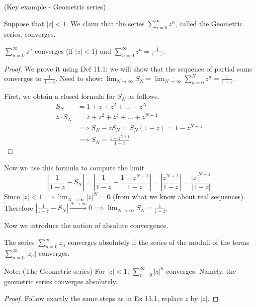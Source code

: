 \begin{example} \label{example:13.1} (Key example - Geometric series)

Suppose that $|z| < 1$. We claim that the series $\sum_{n=0}^{\infty} z^n$, called the Geometric series, converges.
\begin{claim}\label{claim:11.5}
    $\sum_{n=0}^{\infty} z^n$ converges (if $|z| < 1$) and $\sum_{n=0}^{\infty} z^n = \frac{1}{1-z}$.
\end{claim}
\begin{proof}
    We prove it using Def 11.1: we will show that the sequence of partial sums converges to $\frac{1}{1-z}$.
    Need to show: $\lim_{N \to \infty} S_N = \lim_{N \to \infty} \sum_{n=0}^{N} z^n = \frac{1}{1-z}$.
    
    First, we obtain a closed formula for $S_N$ as follows.
    \begin{align*}
        S_N &= 1 + z + z^2 + \dots + z^N \\
        z \cdot S_N &= z + z^2 + z^3 + \dots + z^{N+1} \\
        &\implies S_N - zS_N = S_N(1-z) = 1 - z^{N+1} \\
        &\implies S_N = \frac{1 - z^{N+1}}{1-z}
    \end{align*}
\end{proof}
Now we use this formula to compute the limit
\[ \left| \frac{1}{1-z} - S_N \right| = \left| \frac{1}{1-z} - \frac{1 - z^{N+1}}{1-z} \right| = \left| \frac{z^{N+1}}{1-z} \right| = \frac{|z|^{N+1}}{|1-z|} \]
Since $|z| < 1 \implies \lim_{N \to \infty} |z|^N = 0$ (from what we know about real sequences). Therefore $\left| \frac{1}{1-z} - S_N \right| \xrightarrow{N \to \infty} 0 \implies \lim_{N \to \infty} S_N = \frac{1}{1-z}$.
\end{example}


Now we introduce the notion of absolute convergence.

\begin{definition}\label{definition:11.2} The series $\sum_{n=0}^{\infty} z_n$ converges absolutely if the series of the moduli of the terms $\sum_{n=0}^{\infty} |z_n|$ converges.
\end{definition}

\begin{remark}
Note: (The Geometric series) For $|z| < 1$, $\sum_{n=0}^{\infty} |z|^n$ converges. Namely, the geometric series converges absolutely.
\begin{proof}
    Follow exactly the same steps as in Ex 13.1, replace $z$ by $|z|$.
\end{proof}
\end{remark}

